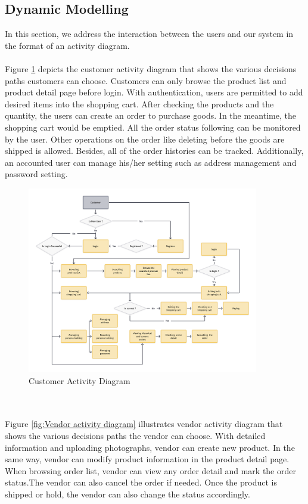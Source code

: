 \documentclass{article}
\begin{document}
\newpage
\subsection{Dynamic Modelling}
In this section, we address the interaction between the users and our system in the format of an activity diagram.
\\\\
Figure \ref{fig:Customer activity diagram} depicts the customer activity diagram that shows the various decisions paths customers can choose. Customers can only browse the product list and product detail page before login. With authentication, users are permitted to add desired items into the shopping cart. After checking the products and the quantity, the users can create an order to purchase goods. In the meantime, the shopping cart would be emptied. All the order status following can be monitored by the user. Other operations on the order like deleting before the goods are shipped is allowed.  Besides, all of the order histories can be tracked. Additionally, an accounted user can manage his/her setting such as address management and password setting. 
\begin{figure}[!htp]
    \centering
    \includegraphics[width=0.9\textwidth]{Customer activity diagram.png}
    \caption{\label{fig:Customer activity diagram}Customer Activity Diagram}
\end{figure}
\\\\
Figure \ref{fig:Vendor activity diagram} illustrates vendor activity diagram that shows the various decisions paths the vendor can choose. With detailed information and uploading photographs, vendor can create new product. In the same way, vendor can modify product information in the product detail page. When browsing order list, vendor can view any order detail and mark the order status.The vendor can also cancel the order if needed. Once the product is shipped or hold, the vendor can also change the status accordingly.
\end{document}
